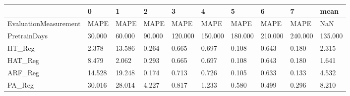 \begin{tabular}{llllllllll}
\toprule
{} &      0 &      1 &      2 &       3 &       4 &       5 &       6 &       7 &    mean \\
\midrule
EvaluationMeasurement &   MAPE &   MAPE &   MAPE &    MAPE &    MAPE &    MAPE &    MAPE &    MAPE &     NaN \\
PretrainDays          & 30.000 & 60.000 & 90.000 & 120.000 & 150.000 & 180.000 & 210.000 & 240.000 & 135.000 \\
HT\_Reg                &  2.378 & 13.586 &  0.264 &   0.665 &   0.697 &   0.108 &   0.643 &   0.180 &   2.315 \\
HAT\_Reg               &  8.479 &  2.062 &  0.293 &   0.665 &   0.697 &   0.108 &   0.643 &   0.180 &   1.641 \\
ARF\_Reg               & 14.528 & 19.248 &  0.174 &   0.713 &   0.726 &   0.105 &   0.633 &   0.133 &   4.532 \\
PA\_Reg                & 30.016 & 28.014 &  4.227 &   0.817 &   1.233 &   0.580 &   0.499 &   0.296 &   8.210 \\
\bottomrule
\end{tabular}

